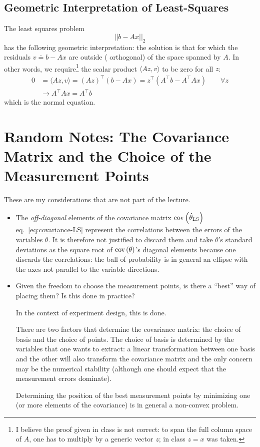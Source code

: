 \subsection{Geometric Interpretation of Least-Squares}

The least squares problem
\begin{equation*}
  ||b - Ax||_2
\end{equation*}
has the following geometric interpretation: the solution is that for which the residuals $v \doteq b - Ax$ are outside ( orthogonal) of the space spanned by $A$.
In other words, we require\footnote{I believe the proof given in class is not correct: to span the full column space of $A$, one has to multiply by a generic vector $z$; in class $z=x$ was taken.} the scalar product $\langle Az, v\rangle$ to be zero for all $z$:
\begin{align*}
  0 &= \langle Az, v\rangle = (Az)^\top(b-Ax) = z^\top \left(A^\top b - A^\top Ax\right)\hspace{2em}\forall z \\
    &\rightarrow A^\top Ax = A^\top b
\end{align*}
which is the normal equation.


\section{Random Notes: The Covariance Matrix and the Choice of the Measurement Points}
\label{question-covariance}

These are my considerations that are not part of the lecture.

\begin{itemize}
\item The \emph{off-diagonal} elements of the covariance matrix $\textrm{cov}\left(\hat{\theta}_\textrm{LS}\right)$ eq.~\eqref{eq:covariance-LS} represent the correlations between the errors of the variables $\theta$.
It is therefore not justified to discard them and take $\theta$'s standard deviations as the square root of $\textrm{cov}\left(\theta\right)$'s diagonal elements because one discards the correlations: the ball of probability is in general an ellipse with the axes not parallel to the variable directions.

\item Given the freedom to choose the measurement points, is there a ``best'' way of placing them? Is this done in practice?

  In the context of experiment design, this is done.

  There are two factors that determine the covariance matrix: the choice of basis and the choice of points.
  The choice of basis is determined by the variables that one wants to extract: a linear transformation between one basis and the other will also transform the covariance matrix and the only concern may be the numerical stability (although one should expect that the measurement errors dominate).

  Determining the position of the best measurement points by minimizing one (or more elements of the covariance) is in general a non-convex problem.
\end{itemize}

